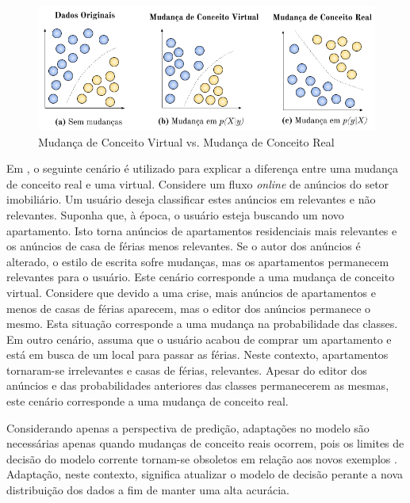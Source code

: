 \documentclass[qual, classic, a4paper]{ufbathesis}
\begin{document}
\begin{figure}[!ht]
\begin{center}
    \includegraphics[scale=0.8]{imagens/concept_drift.png}
    \caption{Mudança de Conceito Virtual vs. Mudança de Conceito Real}
    \label{fig:real_and_virtual_concept_drift}
\end{center}
\end{figure}

Em \cite{Gama:2014:SCD:2597757.2523813}, o seguinte cenário é utilizado para explicar a diferença entre uma mudança de conceito real e uma virtual.
Considere um fluxo \textit{online} de anúncios do setor imobiliário.
Um usuário deseja classificar estes anúncios em relevantes e não relevantes.
Suponha que, à época, o usuário esteja buscando um novo apartamento. 
Isto torna anúncios de apartamentos residenciais mais relevantes e os anúncios de casa de férias menos relevantes.
Se o autor dos anúncios é alterado, o estilo de escrita sofre mudanças, mas os apartamentos permanecem relevantes para o usuário.
Este cenário corresponde a uma mudança de conceito virtual.
Considere que devido a uma crise, mais anúncios de apartamentos e menos de casas de férias aparecem, mas o editor dos anúncios permanece o mesmo.
Esta situação corresponde a uma mudança na probabilidade das classes.
Em outro cenário, assuma que o usuário acabou de comprar um apartamento e está em busca de um local para passar as férias.
Neste contexto, apartamentos tornaram-se irrelevantes e casas de férias, relevantes.
Apesar do editor dos anúncios e das probabilidades anteriores das classes permanecerem as mesmas, este cenário corresponde a uma mudança de conceito real.

Considerando apenas a perspectiva de predição, adaptações no modelo são necessárias apenas quando mudanças de conceito reais ocorrem, 
pois os limites de decisão do modelo corrente tornam-se obsoletos em relação aos novos exemplos \cite{Gama:2014:SCD:2597757.2523813}.
Adaptação, neste contexto, significa atualizar o modelo de decisão perante a nova distribuição dos dados a fim de manter uma alta acurácia.
\end{document}
